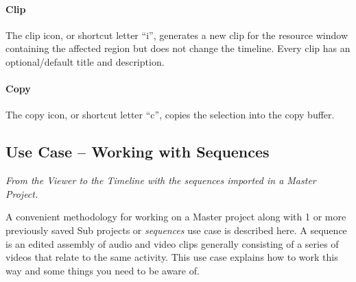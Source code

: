 \paragraph{Clip} The clip icon, or shortcut letter “i”, generates a new clip for the resource window containing the affected region but does not change the timeline.  Every clip has an optional/default title and description.

\paragraph{Copy} The copy icon, or shortcut letter “c”, copies the selection into the copy buffer.

\subsection{Use Case – Working with Sequences}
\label{sub:use_case_working_sequences}

\textit{From the Viewer to the Timeline with the sequences imported 
in a Master Project.}

A convenient methodology for working on a Master project along with 1 or more previously saved Sub projects or \textit{sequences} use case is described here.  A sequence is an edited assembly of audio and video clips generally consisting of a series of videos that relate to the same activity. This use case explains how to work this way and some things you need to be aware of.

